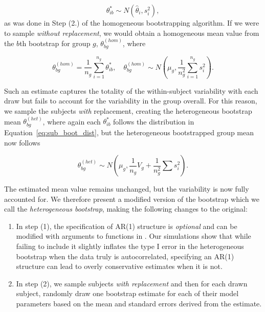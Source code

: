 \begin{equation}\label{eq:sub_boot_dist}
\theta^*_{ib} \sim N(\hat{\theta}_i, s_i^2),
\end{equation}
as was done in Step (2.) of the homogeneous bootstrapping algorithm. If we were to sample \textit{without replacement}, we would obtain a homogeneous mean value from the $b$th bootstrap for group $g$, $\theta^{(hom)}_{bg}$, where

\begin{equation}\label{eq:wo_rep_boot}
\theta^{(hom)}_{bg} = \frac{1}{n_g} \sum_{i=1}^{n_g} \theta^{*}_{ib}, \quad \theta^{(hom)}_{bg} \sim N \left( \mu_{g}, \frac{1}{n_g^2} \sum_{i=1}^{n_g} s_i^2 \right).
\end{equation}

Such an estimate captures the totality of the within-subject variability with each draw but fails to account for the variability in the group overall. For this reason, we sample the subjects \textit{with} replacement, creating the heterogeneous bootstrap mean $\theta_{bg}^{(het)}$, where again each $\theta_{ib}^*$ follows the distribution in Equation~\ref{eq:sub_boot_dist}, but the heterogeneous bootstrapped group mean now follows

\begin{equation}\label{eq:w_rep_boot}
\theta_{bg}^{(het)} \sim N \left( \mu_{g}, \frac{1}{n_g} V_{g} + \frac{1}{n_g^2} \sum s_i^2 \right).
\end{equation}


The estimated mean value remains unchanged, but the variability is now fully accounted for. We therefore present a modified version of the bootstrap which we call the \textit{heterogeneous bootstrap}, making the following changes to the original:  

\begin{enumerate}
\item In step (1), the specification of AR(1) structure is \textit{optional} and can be modified with arguments to functions in . Our simulations show that while failing to include it slightly inflates the type I error in the heterogeneous bootstrap when the data truly is autocorrelated, specifying an AR(1) structure can lead to overly conservative estimates when it is not.
\item In step (2), we sample subjects \textit{with replacement} and then for each drawn subject, randomly draw one bootstrap estimate for each of their model parameters based on the mean and standard errors derived from the  estimate.
\end{enumerate}

